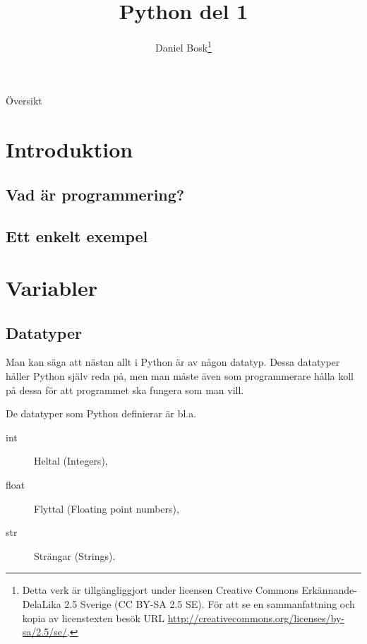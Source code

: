\documentclass{beamer}
\title{%
  Python del 1
}
\author{Daniel Bosk\footnote{%
  \tiny
  Detta verk är tillgängliggjort under licensen Creative Commons 
  Erkännande-DelaLika 2.5 Sverige (CC BY-SA 2.5 SE).
  För att se en sammanfattning och kopia av licenstexten besök URL 
  \url{http://creativecommons.org/licenses/by-sa/2.5/se/}.
}}
\institute[MIUN IKS]{%
  Avdelningen för informations- och kommunikationssytem (IKS),\\
  Mittuniversitetet, Sundsvall.
}
\date{\svnId}
\begin{document}
\begin{frame}
  \titlepage
\end{frame}

\begin{frame}{Översikt}
  \tableofcontents
\end{frame}

%  





\section{Introduktion}

\subsection{Vad är programmering?}

\begin{frame}{\insertsubsectionhead}
\end{frame}

\subsection{Ett enkelt exempel}

\begin{frame}{\insertsubsectionhead}
\end{frame}


\section{Variabler}

\subsection{Datatyper}

\begin{frame}{\insertsubsectionhead}
  Man kan säga att nästan allt i Python är av någon datatyp. Dessa datatyper
  håller Python själv reda på, men man måste även som programmerare hålla koll
  på dessa för att programmet ska fungera som man vill.

  De datatyper som Python definierar är bl.a.
  \begin{description}
    \item[int] Heltal (Integers),
    \item[float] Flyttal (Floating point numbers),
    \item[str] Strängar (Strings).
  \end{description}
\end{frame}
\end{document}

